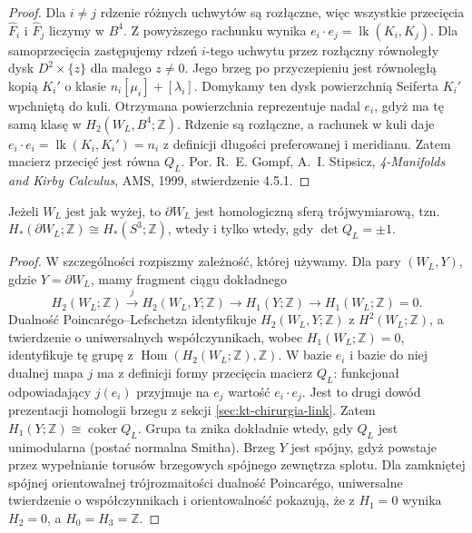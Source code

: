 \begin{proof}
Dla $i\ne j$ rdzenie różnych uchwytów są rozłączne,
więc wszystkie przecięcia $\widehat F_i$
i $\widehat F_j$ liczymy w $B^4$.
Z powyższego rachunku wynika
$e_i\cdot e_j=\operatorname{lk}(K_i,K_j)$.
Dla samoprzecięcia zastępujemy rdzeń $i$-tego
uchwytu przez rozłączny równoległy dysk
$D^2\times\{z\}$ dla małego $z\ne0$.
Jego brzeg po przyczepieniu jest równoległą
kopią $K_i'$ o klasie $n_i[\mu_i]+[\lambda_i]$.
Domykamy ten dysk powierzchnią Seiferta $K_i'$
wpchniętą do kuli. Otrzymana powierzchnia
reprezentuje nadal $e_i$, gdyż ma tę samą klasę
w $H_2(W_L,B^4;\mathbb Z)$.
Rdzenie są rozłączne, a rachunek w kuli daje
$e_i\cdot e_i=\operatorname{lk}(K_i,K_i')=n_i$
z definicji długości preferowanej i meridianu.
Zatem macierz przecięć jest równa $Q_L$.
Por. R.~E. Gompf, A.~I. Stipsicz,
\emph{4-Manifolds and Kirby Calculus}, AMS, 1999,
stwierdzenie 4.5.1.
\end{proof}

\begin{wniosek}
Jeżeli $W_L$ jest jak wyżej, to $\partial W_L$ jest
homologiczną sferą trójwymiarową, tzn.
$H_*(\partial W_L;\mathbb Z)\cong H_*(S^3;\mathbb Z)$,
wtedy i tylko wtedy, gdy $\det Q_L=\pm1$.
\end{wniosek}

\begin{proof}
W szczególności rozpiszmy zależność, której używamy.
Dla pary $(W_L,Y)$, gdzie $Y=\partial W_L$, mamy
fragment ciągu dokładnego
\[
H_2(W_L;\mathbb Z)\xrightarrow{j}
H_2(W_L,Y;\mathbb Z)\longrightarrow
H_1(Y;\mathbb Z)\longrightarrow H_1(W_L;\mathbb Z)=0.
\]
Dualność Poincarégo--Lefschetza identyfikuje
$H_2(W_L,Y;\mathbb Z)$ z $H^2(W_L;\mathbb Z)$,
a twierdzenie o uniwersalnych współczynnikach,
wobec $H_1(W_L;\mathbb Z)=0$, identyfikuje tę grupę
z $\operatorname{Hom}(H_2(W_L;\mathbb Z),\mathbb Z)$.
W bazie $e_i$ i bazie do niej dualnej mapa $j$
ma z definicji formy przecięcia macierz $Q_L$:
funkcjonał odpowiadający $j(e_i)$ przyjmuje
na $e_j$ wartość $e_i\cdot e_j$.
Jest to drugi dowód prezentacji homologii brzegu
z sekcji \ref{sec:kt-chirurgia-link}.
Zatem $H_1(Y;\mathbb Z)\cong\operatorname{coker}Q_L$.
Grupa ta znika dokładnie wtedy, gdy $Q_L$ jest
unimodularna (postać normalna Smitha).
Brzeg $Y$ jest spójny, gdyż powstaje przez
wypełnianie torusów brzegowych spójnego
zewnętrza splotu. Dla zamkniętej spójnej orientowalnej
trójrozmaitości dualność Poincarégo, uniwersalne twierdzenie
o współczynnikach i orientowalność pokazują, że z
$H_1=0$ wynika $H_2=0$, a $H_0=H_3=\mathbb Z$.
\end{proof}

